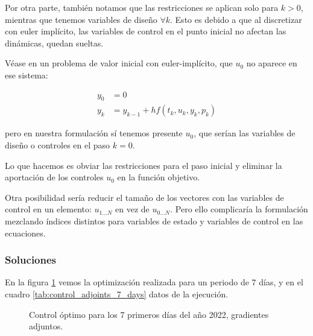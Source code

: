 Por otra parte, también notamos que las restricciones se aplican solo para
$k > 0$, mientras que tenemos variables de diseño $\forall k$. Esto es debido
a que al discretizar con euler implícito, las variables de control en el
punto inicial no afectan las dinámicas, quedan sueltas.

Véase en un problema de valor inicial con euler-implícito, que $u_0$ no aparece
en ese sistema:

\begin{align*}
	y_0 & = 0                                 \\
	y_k & = y_{k-1} + h f(t_k, u_k, y_k, p_k)
\end{align*}

pero en nuestra formulación sí tenemos presente $u_0$, que serían las variables
de diseño o controles en el paso $k=0$.

Lo que hacemos es obviar las restricciones para el paso inicial y eliminar la
aportación de los controles $u_0$ en la función objetivo.

Otra posibilidad sería reducir el tamaño de los vectores con las variables de
control en un elemento: $u_{1 \ldots N}$ en vez de $u_{0 \ldots N}$. Pero ello
complicaría la formulación mezclando índices distintos para variables de estado
y variables de control en las ecuaciones.


\subsubsection{Soluciones}

En la figura \ref{fig:control_adjoints_7_days} vemos la optimización realizada
para un periodo de 7 días, y en el cuadro \ref{tab:control_adjoints_7_days}
datos de la ejecución.

\begin{figure}[h] \centering
	\centering
	
	\caption{Control óptimo para los 7 primeros días del año 2022, gradientes adjuntos.}
	\label{fig:control_adjoints_7_days}
\end{figure}

